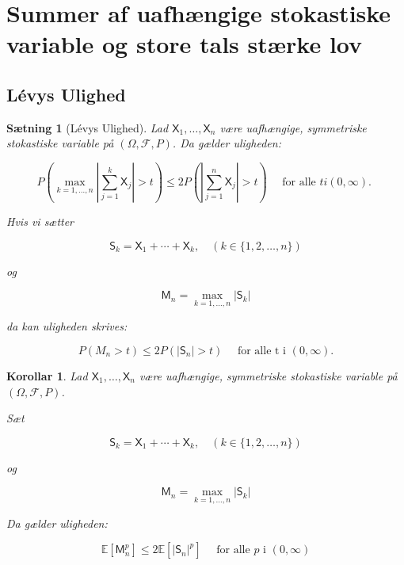 \documentclass{article}
\newcommand{\1}{\mathbbm{1}}
\newtheorem{corollary}[theorem]{Korollar}
\newtheorem{proposition}[theorem]{Sætning}
\theoremstyle{boxed}
\begin{document}
\section{Summer af uafhængige stokastiske variable og store tals stærke lov}
\subsection{Lévys Ulighed}
\begin{theorem-box}
    \begin{proposition}[Lévys Ulighed]
        Lad $\mathsf{X}_1, \ldots, \mathsf{X}_n$ være uafhængige, symmetriske stokastiske variable på $(\Omega, \mathcal{F}, P)$. Da gælder uligheden:

$$
P\left(\max _{k=1, \ldots, n}\left|\sum_{j=1}^k \mathsf{X}_j\right|>t\right) \leq 2 P\left(\left|\sum_{j=1}^n \mathsf{X}_j\right|>t\right) \quad \text { for alle } t i(0, \infty) \text {. }
$$


Hvis vi sætter

$$
\mathsf{S}_k=\mathsf{X}_1+\cdots+\mathsf{X}_k, \quad(k \in\{1,2, \ldots, n\})
$$

og

$$
\mathsf{M}_n=\max _{k=1, \ldots, n}\left|\mathsf{S}_k\right|
$$

da kan uligheden skrives:

$$
P\left(M_n>t\right) \leq 2 P\left(\left|\mathsf{S}_n\right|>t\right) \quad \text { for alle t i } (0, \infty) .
$$

    \end{proposition}
\end{theorem-box}
\begin{theorem-box}
    \begin{corollary}
        Lad $\mathsf{X}_1, \ldots, \mathsf{X}_n$ være uafhængige, symmetriske stokastiske variable på $(\Omega, \mathcal{F}, P)$.

Sæt

$$
\mathsf{S}_k=\mathsf{X}_1+\cdots+\mathsf{X}_k, \quad(k \in\{1,2, \ldots, n\})
$$

og

$$
\mathsf{M}_n=\max _{k=1, \ldots, n}\left|\mathsf{S}_k\right|
$$


Da gælder uligheden:

$$
\mathbb{E}\left[\mathsf{M}_n^p\right] \leq 2 \mathbb{E}\left[\left|\mathsf{S}_n\right|^p\right] \quad \text { for alle } p \text { i }(0, \infty)
$$

    \end{corollary}
\end{theorem-box}
\end{document}
